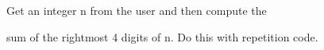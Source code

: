 Get an integer n from the user and then compute the

sum of the rightmost 4 digits of n. Do this with repetition code.

